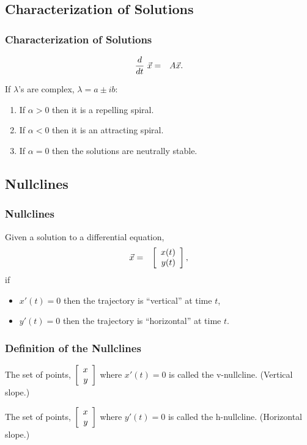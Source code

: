 \subsection{Characterization of Solutions}

\begin{frame}
  \frametitle{Characterization of Solutions}

  \begin{eqnarray*}
    \deriv{~}{t} \vec{x} & = & A \vec{x}.
  \end{eqnarray*}

  If $\lambda$'s are complex, $\lambda = a \pm ib$:
  \begin{enumerate}
  \item If $\alpha>0$ then it is a repelling spiral.
  \item If $\alpha<0$ then it is an attracting spiral.
  \item If $\alpha=0$ then the solutions are neutrally stable.
  \end{enumerate}

\end{frame}


\subsection{Nullclines}

\begin{frame}
  \frametitle{Nullclines}

  Given a solution to a differential equation,
  \begin{eqnarray*}
    \vec{x} & = & \vecTwo{x(t)}{y(t)},
  \end{eqnarray*}
  if
  \begin{itemize}
  \item $x'(t)=0$ then the trajectory is ``vertical'' at time $t$,
  \item $y'(t)=0$ then the trajectory is ``horizontal'' at time $t$.
  \end{itemize}

\end{frame}


\begin{frame}
  \frametitle{Definition of the Nullclines}

  The set of points, $\vecTwo{x}{y}$ where $x'(t)=0$ is called the v-nullcline. (Vertical slope.)

  The set of points, $\vecTwo{x}{y}$ where $y'(t)=0$ is called the h-nullcline. (Horizontal slope.)

\end{frame}


